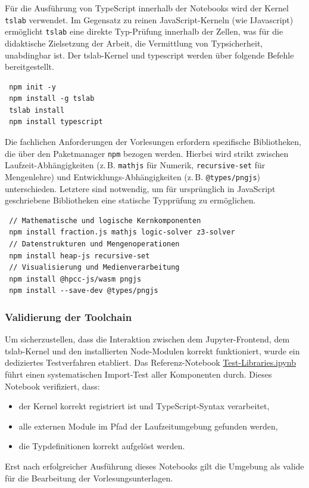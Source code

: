 Für die Ausführung von TypeScript innerhalb der Notebooks wird der Kernel \texttt{tslab} verwendet. Im Gegensatz zu reinen JavaScript-Kerneln (wie IJavascript) ermöglicht \texttt{tslab} eine direkte Typ-Prüfung innerhalb der Zellen, was für die didaktische Zielsetzung der Arbeit, die Vermittlung von Typsicherheit, unabdingbar ist. Der tslab-Kernel und typescript werden über folgende Befehle bereitgestellt.  

\begin{verbatim}
 npm init -y
 npm install -g tslab
 tslab install
 npm install typescript
\end{verbatim}

Die fachlichen Anforderungen der Vorlesungen erfordern spezifische Bibliotheken, die über den Paketmanager \texttt{npm} bezogen werden. Hierbei wird strikt zwischen Laufzeit-Abhängigkeiten (z.\,B. \texttt{mathjs} für Numerik, \texttt{recursive-set} für Mengenlehre) und Entwicklungs-Abhängigkeiten (z.\,B. \texttt{@types/pngjs}) unterschieden. Letztere sind notwendig, um für ursprünglich in JavaScript geschriebene Bibliotheken eine statische Typprüfung zu ermöglichen.

\begin{verbatim}
 // Mathematische und logische Kernkomponenten
 npm install fraction.js mathjs logic-solver z3-solver
 // Datenstrukturen und Mengenoperationen
 npm install heap-js recursive-set
 // Visualisierung und Medienverarbeitung
 npm install @hpcc-js/wasm pngjs
 npm install --save-dev @types/pngjs
\end{verbatim}

\subsubsection{Validierung der Toolchain}
Um sicherzustellen, dass die Interaktion zwischen dem Jupyter-Frontend, dem tslab-Kernel und den installierten Node-Modulen korrekt funktioniert, wurde ein dediziertes Testverfahren etabliert. Das Referenz-Notebook \href{https://github.com/zLeoll/TS-Translation-for-TheoInf/blob/main/Algorithms/TypeScript/Chapter-02/Test-Libraries.ipynb}{Test-Libraries.ipynb} führt einen systematischen Import-Test aller Komponenten durch. Dieses Notebook verifiziert, dass:
\begin{itemize}
	\item der Kernel korrekt registriert ist und TypeScript-Syntax verarbeitet,
	\item alle externen Module im Pfad der Laufzeitumgebung gefunden werden,
	\item die Typdefinitionen korrekt aufgelöst werden.
\end{itemize}
Erst nach erfolgreicher Ausführung dieses Notebooks gilt die Umgebung als valide für die Bearbeitung der Vorlesungsunterlagen.